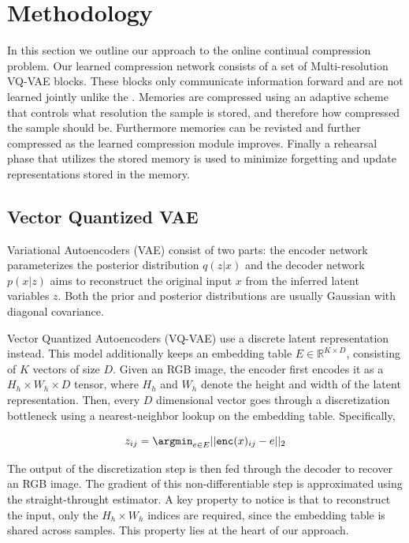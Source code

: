 \documentclass[colorinlistoftodos]{article} %
\begin{document}
\section{Methodology}
In this section we outline our approach to the online continual compression problem. Our learned compression network consists of a set of Multi-resolution VQ-VAE blocks. These blocks only communicate information forward and are not learned jointly unlike the \cite{VQVAE-multi}. Memories are compressed using an adaptive scheme that controls what resolution the sample is stored, and therefore how compressed the sample should be. Furthermore memories can be revisted and further compressed as the learned compression module improves. Finally a rehearsal phase that utilizes the stored memory is used to minimize forgetting and update representations stored in the memory. 

\subsection{Vector Quantized VAE}
Variational Autoencoders (VAE) consist of two parts: the encoder network parameterizes the posterior distribution $q(z|x)$ and the decoder network $p(x|z)$ aims to reconstruct the original input $x$ from the inferred latent variables $z$. Both the prior and posterior distributions are usually Gaussian with diagonal covariance. 

Vector Quantized Autoencoders (VQ-VAE) use a discrete latent representation instead. This model additionally keeps an embedding table $E \in \mathbb{R}^{K \times D}$, consisting of $K$ vectors of size $D$. Given an RGB image, the encoder first encodes it as a $H_h \times W_h \times D$ tensor, where $H_h$ and $W_h$ denote the height and width of the latent representation. Then, every $D$ dimensional vector goes through a discretization bottleneck using a nearest-neighbor lookup on the embedding table. Specifically, 

\begin{equation*}
    z_{ij} = \argmin_{e \in E} || \texttt{enc}(x)_{ij} - e ||_2
\end{equation*} 

The output of the discretization step is then fed through the decoder to recover an RGB image. The gradient of this  non-differentiable step is approximated using the straight-throught estimator. A key property to notice is that to reconstruct the input, only the $H_h \times W_h$ indices are required, since the embedding table is shared across samples. This property lies at the heart of our approach. 
\end{document}
